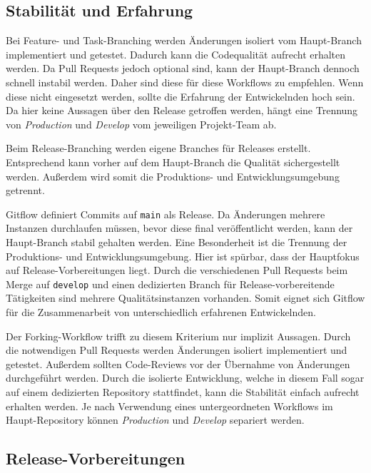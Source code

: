 \subsection{Stabilität und Erfahrung}

Bei Feature- und Task\hyp Branching werden Änderungen isoliert vom Haupt\hyp Branch implementiert und getestet. Dadurch kann die Codequalität aufrecht erhalten werden. Da Pull Requests jedoch optional sind, kann der Haupt\hyp Branch dennoch schnell instabil werden. Daher sind diese für diese Workflows zu empfehlen. Wenn diese nicht eingesetzt werden, sollte die Erfahrung der Entwickelnden hoch sein. Da hier keine Aussagen über den Release getroffen werden, hängt eine Trennung von \emph{Production} und \emph{Develop} vom jeweiligen Projekt\hyp Team ab.

Beim Release\hyp Branching werden eigene Branches für Releases erstellt. Entsprechend kann vorher auf dem Haupt\hyp Branch die Qualität sichergestellt werden. Außerdem wird somit die Produktions- und Entwicklungsumgebung getrennt.

Gitflow definiert Commits auf \texttt{main} als Release. Da Änderungen mehrere Instanzen durchlaufen müssen, bevor diese final veröffentlicht werden, kann der Haupt\hyp Branch stabil gehalten werden. Eine Besonderheit ist die Trennung der Produktions- und Entwicklungsumgebung. Hier ist spürbar, dass der Hauptfokus auf Release\hyp Vorbereitungen liegt. Durch die verschiedenen Pull Requests beim Merge auf \texttt{develop} und einen dedizierten Branch für Release\hyp vorbereitende Tätigkeiten sind mehrere Qualitätsinstanzen vorhanden. Somit eignet sich Gitflow für die Zusammenarbeit von unterschiedlich erfahrenen Entwickelnden.

Der Forking\hyp Workflow trifft zu diesem Kriterium nur implizit Aussagen. Durch die notwendigen Pull Requests werden Änderungen isoliert implementiert und getestet. Außerdem sollten Code\hyp Reviews vor der Übernahme von Änderungen durchgeführt werden. Durch die isolierte Entwicklung, welche in diesem Fall sogar auf einem dedizierten Repository stattfindet, kann die Stabilität einfach aufrecht erhalten werden. Je nach Verwendung eines untergeordneten Workflows im Haupt\hyp Repository können \emph{Production} und \emph{Develop} separiert werden.


\subsection{Release\hyp Vorbereitungen}


